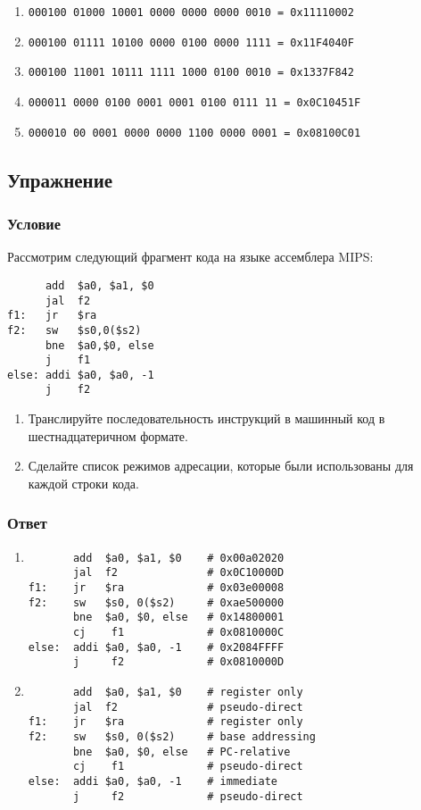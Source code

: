 \documentclass[12pt]{article}
\newenvironment{e}[1][dummy label]{
    \subsection{Упражнение}\label{#1}
    \subsubsection*{Условие}
    }{
    \subsubsection*{Ответ}
}
\begin{document}
    \begin{enumerate}
        \item \texttt{000100 01000 10001 0000 0000 0000 0010 = 0x11110002}
        \item \texttt{000100 01111 10100 0000 0100 0000 1111 = 0x11F4040F}
        \item \texttt{000100 11001 10111 1111 1000 0100 0010 = 0x1337F842}
        \item \texttt{000011 0000 0100 0001 0001 0100 0111 11 = 0x0C10451F}
        \item \texttt{000010 00 0001 0000 0000 1100 0000 0001 = 0x08100C01}
    \end{enumerate}

    \newpage

    \begin{e}
        Рассмотрим следующий фрагмент кода на языке ассемблера MIPS:
        \begin{verbatim}
      add  $a0, $a1, $0
      jal  f2
f1:   jr   $ra
f2:   sw   $s0,0($s2)
      bne  $a0,$0, else
      j    f1
else: addi $a0, $a0, -1
      j    f2
        \end{verbatim}
        \begin{enumerate}
            \item Транслируйте последовательность инструкций в машинный код в шестнадцатеричном формате.
            \item Сделайте список режимов адресации, которые были использованы для каждой строки кода.
        \end{enumerate}
    \end{e}

    \begin{enumerate}
        \item
        \begin{verbatim}
       add  $a0, $a1, $0    # 0x00a02020
       jal  f2              # 0x0C10000D
f1:    jr   $ra             # 0x03e00008
f2:    sw   $s0, 0($s2)     # 0xae500000
       bne  $a0, $0, else   # 0x14800001
       cj    f1             # 0x0810000C
else:  addi $a0, $a0, -1    # 0x2084FFFF
       j     f2             # 0x0810000D
        \end{verbatim}
        \item
        \begin{verbatim}
       add  $a0, $a1, $0    # register only
       jal  f2              # pseudo-direct
f1:    jr   $ra             # register only
f2:    sw   $s0, 0($s2)     # base addressing
       bne  $a0, $0, else   # PC-relative
       cj    f1             # pseudo-direct
else:  addi $a0, $a0, -1    # immediate
       j     f2             # pseudo-direct
        \end{verbatim}
    \end{enumerate}
\end{document}

